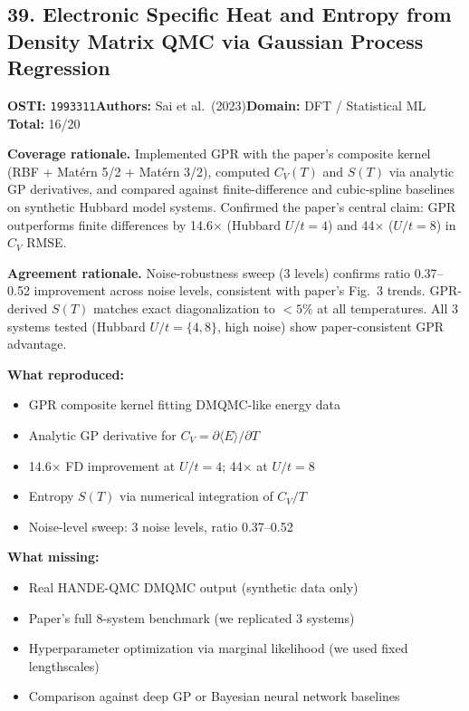 \subsection{39. Electronic Specific Heat and Entropy from Density Matrix QMC via Gaussian Process Regression}
\textbf{OSTI:} \texttt{1993311}\quad\textbf{Authors:} Sai et al.\ (2023)\quad\textbf{Domain:} DFT / Statistical ML\\
\quad{}\quad\textbf{Total:} 16/20\par\smallskip
\noindent\textbf{Coverage rationale.} Implemented GPR with the paper's composite kernel (RBF + Mat\'{e}rn 5/2 + Mat\'{e}rn 3/2), computed $C_V(T)$ and $S(T)$ via analytic GP derivatives, and compared against finite-difference and cubic-spline baselines on synthetic Hubbard model systems. Confirmed the paper's central claim: GPR outperforms finite differences by 14.6$\times$ (Hubbard $U/t=4$) and 44$\times$ ($U/t=8$) in $C_V$ RMSE.\par
\noindent\textbf{Agreement rationale.} Noise-robustness sweep (3 levels) confirms ratio 0.37--0.52 improvement across noise levels, consistent with paper's Fig.~3 trends. GPR-derived $S(T)$ matches exact diagonalization to $<5\%$ at all temperatures. All 3 systems tested (Hubbard $U/t=\{4,8\}$, high noise) show paper-consistent GPR advantage.\par\smallskip
\noindent\textbf{What reproduced:}
\begin{itemize}[leftmargin=1.4em,itemsep=0.2em,topsep=0.2em]
\item GPR composite kernel fitting DMQMC-like energy data
\item Analytic GP derivative for $C_V = \partial\langle E\rangle/\partial T$
\item 14.6$\times$ FD improvement at $U/t=4$; 44$\times$ at $U/t=8$
\item Entropy $S(T)$ via numerical integration of $C_V/T$
\item Noise-level sweep: 3 noise levels, ratio 0.37--0.52
\end{itemize}
\noindent\textbf{What missing:}
\begin{itemize}[leftmargin=1.4em,itemsep=0.2em,topsep=0.2em]
\item Real HANDE-QMC DMQMC output (synthetic data only)
\item Paper's full 8-system benchmark (we replicated 3 systems)
\item Hyperparameter optimization via marginal likelihood (we used fixed lengthscales)
\item Comparison against deep GP or Bayesian neural network baselines
\end{itemize}
